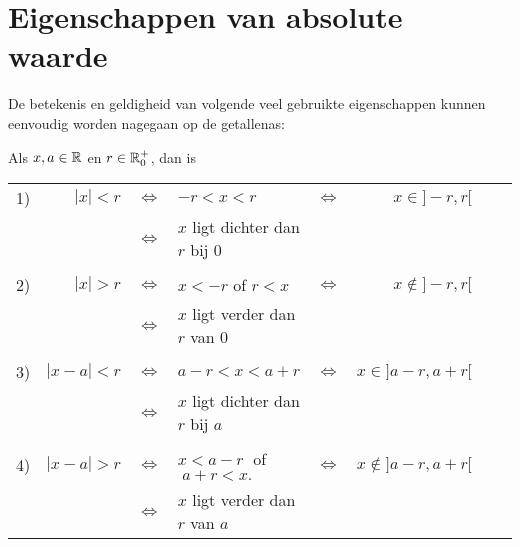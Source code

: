 \documentclass{ximera}
\begin{document}
\section{Eigenschappen van absolute waarde}
De betekenis en geldigheid van volgende veel gebruikte eigenschappen kunnen eenvoudig worden nagegaan op de getallenas:
\begin{proposition}\label{basisaw}
	Als $x,a \in \mathbb{R}$ en $r\in\mathbb{R}^+_0$, dan is 

	\begin{tabular}{lrclrrrr} 
	1)&$|x|<r$   &$\Leftrightarrow$ &$-r<x<r$  & $\Leftrightarrow$ & $x\in]-r,r[$     \\ & & $\Leftrightarrow$&$x$ ligt dichter dan $r$ bij $0$    \\
	\\
	2)&$|x|>r$   &$\Leftrightarrow$ &$x<-r$ of $r<x$ & $\Leftrightarrow$ & $x\notin]-r,r[$   
	\\ & & $\Leftrightarrow$ &$x$ ligt verder dan $r$ van $0$    \\
	\\
	3)&$|x-a|<r$ & $\Leftrightarrow$ & $ a-r<x<a+r$  & $\Leftrightarrow$ & $x\in]a-r,a+r[$ 
	\\ & & $\Leftrightarrow$ & $x$ ligt dichter dan $r$ bij $a$           \\
	\\
	4)&$|x-a|>r$ & $\Leftrightarrow$ & $ x<a-r\;$ of $\;a+r<x.$  & $\Leftrightarrow$ & $x\notin]a-r,a+r[$  
	\\ & & $\Leftrightarrow$ & $x$ ligt verder dan $r$ van $a$\\
	\end{tabular}        
\end{proposition}
\end{document}
